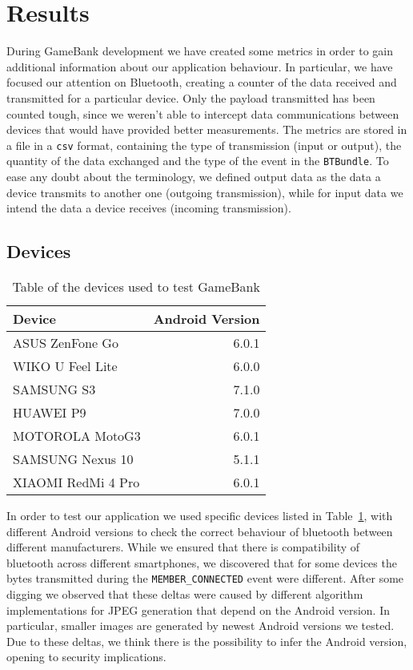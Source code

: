 \section{Results}
\label{results}

During GameBank development we have created some metrics in order to gain 
additional information about our application behaviour. In particular, we 
have focused our attention on Bluetooth, creating a counter of the data 
received and transmitted for a particular device. Only the payload transmitted 
has been counted tough, since we weren't able to intercept data communications 
between devices that would have provided better measurements. The metrics are 
stored in a file in a \texttt{csv} format, containing the type of transmission 
(input or output), the quantity of the data exchanged and the type of the 
event in the \texttt{BTBundle}. To ease any doubt about the terminology, we 
defined output data as the data a device transmits to another one (outgoing 
transmission), while for input data we intend the data a device receives 
(incoming transmission).

\subsection{Devices}

\begin{table}[t]
 \centering
 \caption{Table of the devices used to test GameBank}
 \label{tab:res:lod}
 \begin{tabular}{l r}
  \textbf{Device} & \textbf{Android Version} \\ \toprule
  ASUS ZenFone Go & 6.0.1 \\
  WIKO U Feel Lite & 6.0.0 \\
  SAMSUNG S3 & 7.1.0 \\
  HUAWEI P9 & 7.0.0 \\
  MOTOROLA MotoG3 & 6.0.1 \\
  SAMSUNG Nexus 10 & 5.1.1 \\
  XIAOMI RedMi 4 Pro & 6.0.1
 \end{tabular}
\end{table}

In order to test our application we used specific devices listed in 
Table~\ref{tab:res:lod}, with different Android versions to check the correct 
behaviour of bluetooth between different manufacturers. While we ensured that 
there is compatibility of bluetooth across different smartphones, we discovered 
that for some devices the bytes transmitted during the 
\texttt{MEMBER\_CONNECTED} event were different. After some digging we observed 
that these deltas were caused by different algorithm implementations for JPEG 
generation that depend on the Android version. In particular, smaller images 
are generated by newest Android versions we tested. Due to these deltas, we 
think there is the possibility to infer the Android version, opening to security 
implications.


